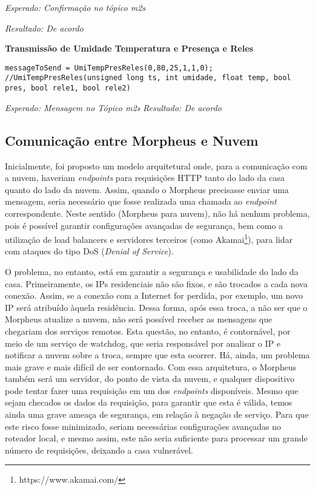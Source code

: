 \textit{Esperado: Confirmação no tópico \wmqtt{} m2s}

\textit{Resultado: De acordo}

\textbf{Transmissão de Umidade Temperatura e Presença e Reles}
\begin{lstlisting}
messageToSend = UmiTempPresReles(0,80,25,1,1,0);
//UmiTempPresReles(unsigned long ts, int umidade, float temp, bool pres, bool rele1, bool rele2)
\end{lstlisting}

\textit{Esperado: Mensagem no Tópico \wmqtt{} m2s}
\textit{Resultado: De acordo}


\subsection{Comunicação entre Morpheus e Nuvem}

Inicialmente, foi proposto um modelo arquitetural onde, para a comunicação com a nuvem, haveriam \textit{endpoints} para requisições HTTP tanto do lado da casa quanto do lado da nuvem. Assim, quando o Morpheus precisasse enviar uma mensagem, seria necessário que fosse realizada uma chamada ao \textit{endpoint} correspondente. Neste sentido (Morpheus para nuvem), não há nenhum problema, pois é possível garantir configurações avançadas de segurança, bem como a utilização de load balancers e servidores terceiros (como Akamai\footnote{https://www.akamai.com/}), para lidar com ataques do tipo DoS (\textit{Denial of Service}).

O problema, no entanto, está em garantir a segurança e usabilidade do lado da casa. Primeiramente, os IPs residenciais não são fixos, e são trocados a cada nova conexão. Assim, se a conexão com a Internet for perdida, por exemplo, um novo IP será atribuído àquela residência. Dessa forma, após essa troca, a não ser que o Morpheus atualize a nuvem, não será possível receber as mensagens que chegariam dos serviços remotos. Esta questão, no entanto, é contornável, por meio de um serviço de watchdog, que seria responsável por analisar o IP e notificar a nuvem sobre a troca, sempre que esta ocorrer. Há, ainda, um problema mais grave e mais difícil de ser contornado. Com essa arquitetura, o Morpheus também será um servidor, do ponto de vista da nuvem, e qualquer dispositivo pode tentar fazer uma requisição em um dos \textit{endpoints} disponíveis. Mesmo que sejam checados os dados da requisição, para garantir que esta é válida, temos ainda uma grave ameaça de segurança, em relação à negação de serviço. Para que este risco fosse minimizado, seriam necessárias configurações avançadas no roteador local, e mesmo assim, este não seria suficiente para processar um grande número de requisições, deixando a casa vulnerável.

